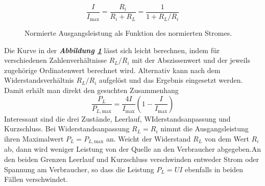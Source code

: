 \begin{equation}
\boxed{\dfrac{I}{I_{\text{max}}}=\dfrac{R_i}{R_i+R_L}=\dfrac{1}{1+R_L/R_i}}
\end{equation}
\begin{figure}[H]
\centering
\caption{Normierte Ausgangsleistung als Funktion des normierten Stromes.}
\label{fig_IIIaa}
\end{figure}
\noindent Die Kurve in der \textbf{\textit{Abbildung \ref{fig_IIIaa}}} lässt sich leicht berechnen, indem für verschiedenen Zahlenverhältnisse $R_L/R_i$ mit der Abszissenwert und der jeweils zugehörige Ordinatenwert berechnet wird. Alternativ kann nach dem Widerstandsverhältnis $R_L/R_i$ aufgelöst und das Ergebnis eingesetzt werden. Damit erhält man direkt den gesuchten Zusammenhang
\begin{equation}
\boxed{\dfrac{P_L}{P_{L,\text{max}}}=\dfrac{4I}{I_{\text{max}}}\left(1-\dfrac{I}{I_{\text{max}}}\right)}
\end{equation}
Interessant sind die drei Zustände, Leerlauf, WIderstandsanpassung und Kurzschluss. Bei Widerstandsanpassung $R_L=R_i$ nimmt die Ausgangsleistung ihren Maximalwert $P_L=P_{L,\text{max}}$ an. Weicht der Widerstand $R_L$ von dem Wert $R_i$ ab, dann wird weniger Leistung von der Quelle an den Verbraucher abgegeben.An den beiden Grenzen Leerlauf und Kurzschluss verschwinden entweder Strom oder Spannung am Verbraucher, so dass die Leistung $P_L=UI$ ebenfalls in beiden Fällen verschwindet.
